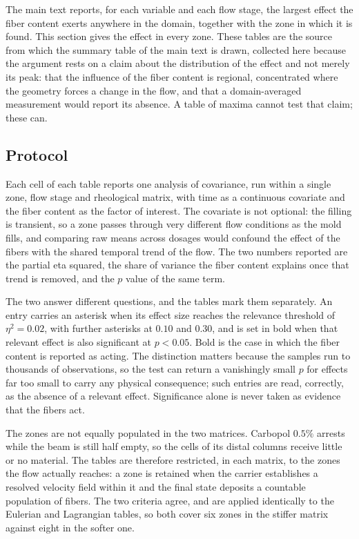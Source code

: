 \documentclass[%
  aip,
  pof,
  reprint,
  floatfix
]{revtex4-2}
\begin{document}
The main text reports, for each variable and each flow stage, the largest effect the fiber content exerts anywhere in the domain, together with the zone in which it is found. This section gives the effect in every zone. These tables are the source from which the summary table of the main text is drawn, collected here because the argument rests on a claim about the distribution of the effect and not merely its peak: that the influence of the fiber content is regional, concentrated where the geometry forces a change in the flow, and that a domain-averaged measurement would report its absence. A table of maxima cannot test that claim; these can.

\subsection{Protocol}

Each cell of each table reports one analysis of covariance, run within a single zone, flow stage and rheological matrix, with time as a continuous covariate and the fiber content as the factor of interest. The covariate is not optional: the filling is transient, so a zone passes through very different flow conditions as the mold fills, and comparing raw means across dosages would confound the effect of the fibers with the shared temporal trend of the flow. The two numbers reported are the partial eta squared, the share of variance the fiber content explains once that trend is removed, and the $p$ value of the same term.

The two answer different questions, and the tables mark them separately. An entry carries an asterisk when its effect size reaches the relevance threshold of $\eta^2 = 0.02$, with further asterisks at $0.10$ and $0.30$, and is set in bold when that relevant effect is also significant at $p < 0.05$. Bold is the case in which the fiber content is reported as acting. The distinction matters because the samples run to thousands of observations, so the test can return a vanishingly small $p$ for effects far too small to carry any physical consequence; such entries are read, correctly, as the absence of a relevant effect. Significance alone is never taken as evidence that the fibers act.

The zones are not equally populated in the two matrices. Carbopol $0.5\%$ arrests while the beam is still half empty, so the cells of its distal columns receive little or no material. The tables are therefore restricted, in each matrix, to the zones the flow actually reaches: a zone is retained when the carrier establishes a resolved velocity field within it and the final state deposits a countable population of fibers. The two criteria agree, and are applied identically to the Eulerian and Lagrangian tables, so both cover six zones in the stiffer matrix against eight in the softer one.
\end{document}
